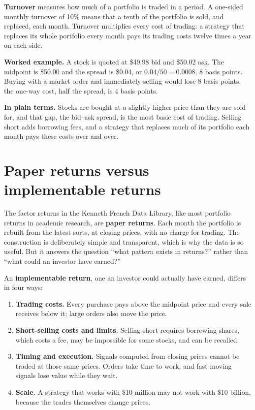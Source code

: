 \textbf{Turnover} measures how much of a portfolio is traded in a period. A one-sided monthly turnover of 10\% means that a tenth of the portfolio is sold, and replaced, each month. Turnover multiplies every cost of trading: a strategy that replaces its whole portfolio every month pays its trading costs twelve times a year on each side.

\textbf{Worked example.} A stock is quoted at \$49.98 bid and \$50.02 ask. The midpoint is \$50.00 and the spread is \$0.04, or $0.04/50 = 0.0008$, 8 basis points. Buying with a market order and immediately selling would lose 8 basis points; the one-way cost, half the spread, is 4 basis points.

\noindent\textbf{In plain terms.} Stocks are bought at a slightly higher price than they are sold for, and that gap, the bid--ask spread, is the most basic cost of trading. Selling short adds borrowing fees, and a strategy that replaces much of its portfolio each month pays these costs over and over.

\section{Paper returns versus implementable returns}
\label{sec:17-paper}

The factor returns in the Kenneth French Data Library, like most portfolio returns in academic research, are \textbf{paper returns}. Each month the portfolio is rebuilt from the latest sorts, at closing prices, with no charge for trading. The construction is deliberately simple and transparent, which is why the data is so useful. But it answers the question ``what pattern exists in returns?'' rather than ``what could an investor have earned?''

An \textbf{implementable return}, one an investor could actually have earned, differs in four ways:

\begin{enumerate}
  \item \textbf{Trading costs.} Every purchase pays above the midpoint price and every sale receives below it; large orders also move the price.
  \item \textbf{Short-selling costs and limits.} Selling short requires borrowing shares, which costs a fee, may be impossible for some stocks, and can be recalled.
  \item \textbf{Timing and execution.} Signals computed from closing prices cannot be traded at those same prices. Orders take time to work, and fast-moving signals lose value while they wait.
  \item \textbf{Scale.} A strategy that works with \$10 million may not work with \$10 billion, because the trades themselves change prices.
\end{enumerate}

